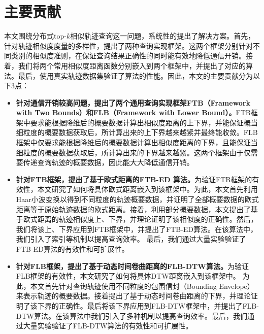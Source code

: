 \section{主要贡献}\label{sec-c1-contribution}
本文围绕分布式top-$k$相似轨迹查询这一问题，系统性的提出了解决方案。首先，针对轨迹相似度度量的多样性，提出了两种查询实现框架。这两个框架分别针对不同类别的相似度准则，在保证查询结果正确性的同时能有效地降低通信开销。接着，我们将两个常用相似度距离函数分别嵌入到两个框架中，并提出了对应的算法。最后，使用真实轨迹数据集验证了算法的性能。因此，本文的主要贡献分为以下3点：
\begin{itemize}
	\item  \textbf{针对通信开销较高问题，提出了两个通用查询实现框架FTB（Framework with Two Bounds）和FLB（Framework with Lower Bound）。}FTB框架中要求能根据降维后的概要数据计算出相似度距离的上下界，并能保证概当细粒度的概要数据获取后，所计算出来的上下界越来越紧并最终能收敛。FLB框架中仅要求能根据降维后的概要数据计算出相似度距离的下界，且能保证当细粒度的概要数据获取后，所计算出来的下界越来越紧。这两个框架由于仅需要传递查询轨迹的概要数据，因此能大大降低通信开销。
	
	\item \textbf{针对FTB框架，提出了基于欧式距离的FTB-ED 算法。}为验证FTB框架的有效性，本文研究了如何将具体欧式距离嵌入到该框架中。为此，本文首先利用Haar小波变换以得到不同粒度的轨迹概要数据，并证明了全部概要数据的欧式距离等于原始轨迹数据的欧式距离。接着，利用部分概要数据，本文提出了基于欧式距离的轨迹相似度上、下界，并理论证明了该相似度的正确性。然后，我们将该上、下界应用到FTB框架中，并提出了FTB-ED算法。在该算法中，我们引入了索引等机制以提高查询效率。
	最后，我们通过大量实验验证了FTB-ED算法的有效性和可扩展性。
	
	\item  \textbf{针对FLB框架，提出了基于动态时间卷曲距离的FLB-DTW算法。}为验证FLB框架的有效性，本文研究了如何将具体DTW距离嵌入到该框架中。
	为此，本文首先针对查询轨迹使用不同粒度的包围信封（Bounding Envelope）来表示轨迹的概要数据。接着提出了基于动态时间卷曲距离的下界，并理论证明了该下界的正确性。最后将该下界应用到FLB-DTW框架中，并提出了FLB-DTW算法。在该算法中我们引入了多种机制以提高查询效率。最后，我们通过大量实验验证了FLB-DTW算法的有效性和可扩展性。
	
\end{itemize}



